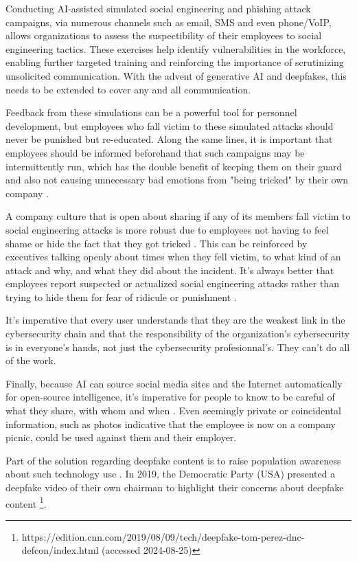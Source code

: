 Conducting AI-assisted simulated social engineering and phishing attack campaigns, via numerous channels such as email, SMS and even phone/VoIP, allows organizations to assess the suspectibility of their employees to social engineering tactics. These exercises help identify vulnerabilities in the workforce, enabling further targeted training and reinforcing the importance of scrutinizing unsolicited communication. With the advent of generative AI and deepfakes, this needs to be extended to cover any and all communication.

Feedback from these simulations can be a powerful tool for personnel development, but employees who fall victim to these simulated attacks should never be punished but re-educated. Along the same lines, it is important that employees should be informed beforehand that such campaigns may be intermittently run, which has the double benefit of keeping them on their guard and also not causing unnecessary bad emotions from "being tricked" by their own company \citep{hadnagySocialEngineering2018, mitnick_The_Art_of_Deception_2003}.

A company culture that is open about sharing if any of its members fall victim to social engineering attacks is more robust due to employees not having to feel shame or hide the fact that they got tricked \citep{hadnagySocialEngineering2018}. This can be reinforced by executives talking openly about times when they fell victim, to what kind of an attack and why, and what they did about the incident. It's always better that employees report suspected or actualized social engineering attacks rather than trying to hide them for fear of ridicule or punishment \citep{mitnick_The_Art_of_Deception_2003}.

It's imperative that every user understands that they are the weakest link in the cybersecurity chain \citep{mitnick_The_Art_of_Deception_2003} and that the responsibility of the organization's cybersecurity is in everyone's hands, not just the cybersecurity profesionnal's. They can't do all of the work.


Finally, because AI can source social media sites and the Internet automatically for open-source intelligence, it's imperative for people to know to be careful of what they share, with whom and when \citep{mitnick_The_Art_of_Deception_2003}. Even seemingly private or coincidental information, such as photos indicative that the employee is now on a company picnic, could be used against them and their employer.

Part of the solution regarding deepfake content is to raise population awareness about such technology use \citep{blauthArtificialIntelligenceCrimeOverviewMaliciousUseAbuse2022}. In 2019, the Democratic Party (USA) presented a deepfake video of their own chairman to highlight their concerns about deepfake content \footnote{https://edition.cnn.com/2019/08/09/tech/deepfake-tom-perez-dnc-defcon/index.html (accessed 2024-08-25)}.